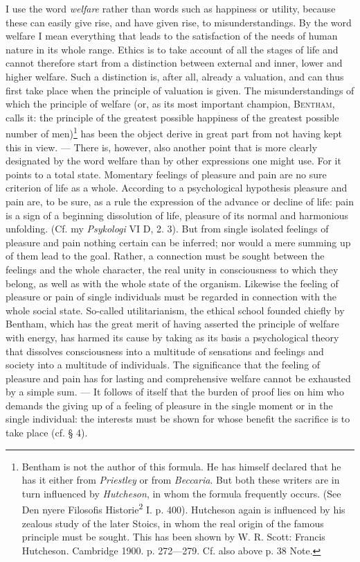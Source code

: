 \documentclass[12pt,a4paper,openany]{book}
\newcommand{\opage}[1]{\marginnote{\footnotesize\textit{[#1]}}}
\begin{document}
I use the word \textit{welfare} rather than words such as happiness or utility, because these can
easily give rise, and have given rise, to misunderstandings. By the word welfare I mean everything
that leads to the satisfaction of the needs of human nature in its whole range. Ethics is to take
account of all the stages of life and cannot therefore start from a distinction between external and
inner, lower and higher welfare. Such a distinction is, after all, already a valuation, and can thus
first take place when the principle of valuation is given. The misunderstandings of which the
principle of welfare (or, as its most important champion, \textsc{Bentham}, calls it: the principle
of the greatest possible happiness of the greatest possible number of
men)\footnote[1]{Bentham is not the author of this formula. He has himself declared that he has it
either from \emph{Priestley} or from \emph{Beccaria}. But both these writers are in turn influenced by
\emph{Hutcheson}, in whom the formula frequently occurs. (See Den nyere Filosofis
Historie\textsuperscript{2} I. p. 400). Hutcheson again is influenced by his zealous study of the later
Stoics, in whom the real origin of the famous principle must be sought. This has been shown by W. R.
Scott: Francis Hutcheson. Cambridge 1900. p. 272---279. Cf. also above p. 38 Note.} has been the
object derive in great part from not having kept this in view. --- There is, however, also another
point that is more clearly designated by the word
\opage{45}welfare than by other expressions one might use. For it points to a total state. Momentary feelings
of pleasure and pain are no sure criterion of life as a whole. According to a psychological
hypothesis pleasure and pain are, to be sure, as a rule the expression of the advance or decline of
life: pain is a sign of a beginning dissolution of life, pleasure of its normal and harmonious
unfolding. (Cf. my \textit{Psykologi} VI D, 2. 3). But from single isolated feelings of pleasure and
pain nothing certain can be inferred; nor would a mere summing up of them lead to the goal. Rather, a
connection must be sought between the feelings and the whole character, the real unity in
consciousness to which they belong, as well as with the whole state of the organism. Likewise the
feeling of pleasure or pain of single individuals must be regarded in connection with the whole
social state. So-called utilitarianism, the ethical school founded chiefly by Bentham, which has the
great merit of having asserted the principle of welfare with energy, has harmed its cause by taking
as its basis a psychological theory that dissolves consciousness into a multitude of sensations and
feelings and society into a multitude of individuals. The significance that the feeling of pleasure
and pain has for lasting and comprehensive welfare cannot be exhausted by a simple sum. --- It follows
of itself that the burden of proof lies on him who demands the giving up of a feeling of pleasure in
the single moment or in the single individual: the interests must be shown for whose benefit the
sacrifice is to take place (cf. § 4).
\end{document}
